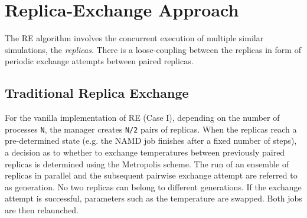 \documentclass[a4paper,10pt]{article}
\newcommand{\jhanote}[1]{ {\textcolor{red} { ***shantenu: #1 }}}
\newcommand{\alnote}[1]{ {\textcolor{blue} { ***andre: #1 }}}
\newcommand{\athotanote}[1]{ {\textcolor{green} { ***athota: #1 }}}
\newcommand{\alnote}[1]{}
\newcommand{\jhanote}[1]{}
\newcommand{\athotanote}[1]{}
\begin{document}

\section{Replica-Exchange Approach}

The RE algorithm involves the concurrent execution of multiple similar
simulations, the \emph{replicas}.  There is a loose-coupling between
the replicas in form of periodic exchange attempts between paired
replicas. %


\subsection{Traditional Replica Exchange}
For the vanilla implementation of RE (Case I), depending
on the number of processes \texttt{N}, the manager creates \texttt{N/2} pairs
of replicas. When the replicas reach a
pre-determined state (e.g. the NAMD job finishes after a fixed number
of steps), a decision as to whether to exchange temperatures between
previously paired replicas is determined using the Metropolis scheme.
The run of an ensemble of replicas in parallel and the subsequent
pairwise exchange attempt are referred to as generation. No two
replicas can belong to different generations. If the exchange attempt
is successful, parameters such as the temperature are swapped. Both
jobs are then relaunched. %
 
\end{document}
